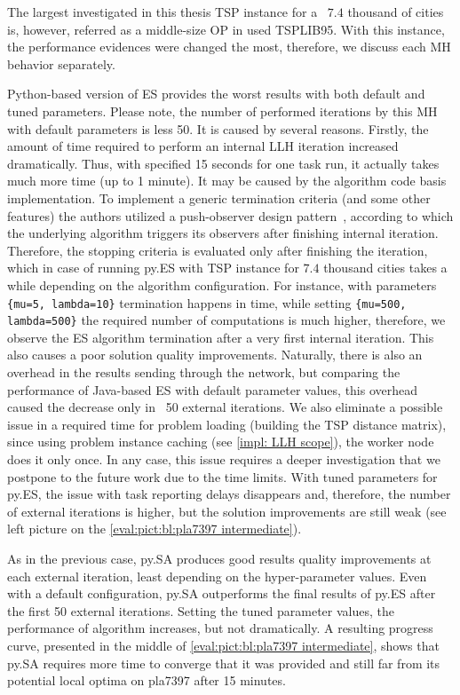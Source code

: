 The largest investigated in this thesis TSP instance for a ~$7.4$ thousand of cities is, however, referred as a middle-size OP in used TSPLIB95. With this instance, the performance evidences were changed the most, therefore, we discuss each MH behavior separately.

Python-based version of ES provides the worst results with both default and tuned parameters. Please note, the number of performed iterations by this MH with default parameters is less 50. It is caused by several reasons. Firstly, the amount of time required to perform an internal LLH iteration increased dramatically. Thus, with specified 15 seconds for one task run, it actually takes much more time (up to 1 minute). It may be caused by the algorithm code basis implementation. To implement a generic termination criteria (and some other features) the authors utilized a push-observer design pattern~\cite{benitez2019jmetalpy}, according to which the underlying algorithm triggers its observers after finishing internal iteration. Therefore, the stopping criteria is evaluated only after finishing the iteration, which in case of running py.ES with TSP instance for $7.4$ thousand cities takes a while depending on the algorithm configuration. For instance, with parameters \texttt{\{mu=5, lambda=10\}} termination happens in time, while setting \texttt{\{mu=500, lambda=500\}} the required number of computations is much higher, therefore, we observe the ES algorithm termination after a very first internal iteration. This also causes a poor solution quality improvements. Naturally, there is also an overhead in the results sending through the network, but comparing the performance of Java-based ES with default parameter values, this overhead caused the decrease only in ~50 external iterations. We also eliminate a possible issue in a required time for problem loading (building the TSP distance matrix), since using problem instance caching (see \cref{impl: LLH scope}), the worker node does it only once. In any case, this issue requires a deeper investigation that we postpone to the future work due to the time limits. With tuned parameters for py.ES, the issue with task reporting delays disappears and, therefore, the number of external iterations is higher, but the solution improvements are still weak (see left picture on the \cref{eval:pict:bl:pla7397 intermediate}).

As in the previous case, py.SA produces good results quality improvements at each external iteration, least depending on the hyper-parameter values. Even with a default configuration, py.SA outperforms the final results of py.ES after the first 50 external iterations. Setting the tuned parameter values, the performance of algorithm increases, but not dramatically. A resulting progress curve, presented in the middle of \cref{eval:pict:bl:pla7397 intermediate}, shows that py.SA requires more time to converge that it was provided and still far from its potential local optima on pla7397 after 15 minutes.


